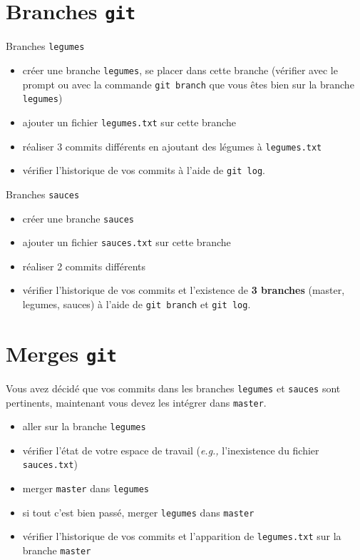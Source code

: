 \documentclass[final, a4paper, openbib, ]{article}
\begin{document}
\section{Branches \texttt{git}}

Branches \texttt{legumes}
\begin{itemize}
\item créer une branche \texttt{legumes}, se placer dans cette branche (vérifier avec le prompt ou avec la commande \texttt{git branch} que vous êtes bien sur la branche \texttt{legumes})
\item ajouter un fichier \texttt{legumes.txt} sur cette branche
\item réaliser 3 commits différents en ajoutant des légumes à \texttt{legumes.txt}
\item vérifier l'historique de vos commits à l'aide de \texttt{git log}.
\end{itemize}

Branches \texttt{sauces}
\begin{itemize}
\item créer une branche \texttt{sauces}
\item ajouter un fichier \texttt{sauces.txt} sur cette branche
\item réaliser 2 commits différents
\item vérifier l'historique de vos commits et l'existence de \textbf{3 branches} (master, legumes, sauces) à l'aide de \texttt{git branch} et \texttt{git log}.
\end{itemize}


\section{Merges \texttt{git}}
Vous avez décidé que vos commits dans les branches \texttt{legumes} et \texttt{sauces} sont pertinents, maintenant vous devez les intégrer dans \texttt{master}.
\begin{itemize}
\item aller sur la branche \texttt{legumes}
\item vérifier l'état de votre espace de travail (\textit{e.g.,} l'inexistence du fichier \texttt{sauces.txt})
\item merger \texttt{master} dans \texttt{legumes}
\item si tout c'est bien passé, merger \texttt{legumes} dans \texttt{master}
\item vérifier l'historique de vos commits et l'apparition de \texttt{legumes.txt} sur la branche \texttt{master}\\
\end{itemize}
\end{document}
